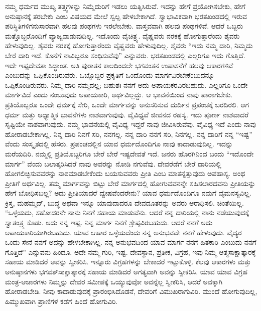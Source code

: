 ನಮ್ಮ ಧರ್ಮದ ಮುಖ್ಯ ತತ್ತ್ವಗಳನ್ನು ನಿಮ್ಮೆದುರಿಗೆ ಇಡಲು ಯತ್ನಿಸಿರುವೆ. ಇದನ್ನು ಹೇಗೆ ಪ್ರಯೋಗಿಸಬೇಕು, ಹೇಗೆ ಅನುಷ್ಠಾನಕ್ಕೆ ತರಬೇಕು ಎಂಬ ವಿಷಯದ ಮೇಲೆ ಸ್ವಲ್ಪ ಹೇಳಬೇಕಾಗಿದೆ. ಸ್ವಾಭಾವಿಕವಾಗಿ ಭರತಖಂಡದಲ್ಲಿ ಇರುವ ಪರಿಸ್ಥಿತಿಗಳಿಗನುಸಾರವಾಗಿ ಹಲವು ಪಂಥಗಳು ಇರಲೇಬೇಕು. ವಾಸ್ತವವಾಗಿ ಹಲವು ಪಂಥಗಳಿವೆ. ಆದರೆ ಒಬ್ಬರು ಮತ್ತೊಬ್ಬರೊಂದಿಗೆ ವ್ಯಾಜ್ಯವಾಡುವುದಿಲ್ಲ. ಇದೊಂದು ವೈಚಿತ್ರ್ಯ. ವೈಷ್ಣವರು ನರಕಕ್ಕೆ ಹೋಗುತ್ತಾರೆಂದು ಶೈವರು ಹೇಳುವುದಿಲ್ಲ. ಶೈವರು ನರಕಕ್ಕೆ ಹೋಗುತ್ತಾರೆಂದು ವೈಷ್ಣವರು ಹೇಳುವುದಿಲ್ಲ. ಶೈವರು “ಇದು ನಮ್ಮ ದಾರಿ, ನಿಮ್ಮದು ಬೇರೆ ದಾರಿ ಇದೆ. ಕೊನೆಗೆ ನಾವಿಬ್ಬರೂ ಸಂಧಿಸುವೆವು” ಎನ್ನುವರು. ಭರತಖಂಡದಲ್ಲಿ ಎಲ್ಲರಿಗೂ ಇದು ಗೊತ್ತಿದೆ. ಇದೇ ಇಷ್ಟದೇವತಾ ಸಿದ್ಧಾಂತ. ಅತಿ ಪುರಾತನ ಕಾಲದಿಂದಲೇ ಭಗವಂತನ ಉಪಾಸನೆಗೆ ಹಲವು ಆಕಾರಗಳಿವೆ ಎಂಬುದನ್ನು ಒಪ್ಪಿಕೊಂಡಿರುವರು. ಒಬ್ಬೊಬ್ಬರ ಪ್ರಕೃತಿಗೆ ಒಂದೊಂದು ಮಾರ್ಗವಿರಬೇಕೆಂಬುದನ್ನೂ ಒಪ್ಪಿಕೊಂಡಿರುವರು. ನಿಮ್ಮ ದಾರಿ ನಮ್ಮದಲ್ಲ; ಬಹುಶಃ ನನಗೆ ಅದು ಅಪಾಯಕರವಿರಬಹುದು. ಎಲ್ಲರಿಗೂ ಒಂದೇ ಮಾರ್ಗವಿದೆ ಎಂದು ನಂಬುವುದು ಅಪಾಯಕಾರಿ, ಅರ್ಥವಿಲ್ಲದ್ದು. ಆ ಭಾವನೆಯಿಂದ ನಾವು ಪಾರಾಗಬೇಕು. ಪ್ರತಿಯೊಬ್ಬರೂ ಒಂದೇ ಧರ್ಮಕ್ಕೆ ಸೇರಿ, ಒಂದೇ ಮಾರ್ಗವನ್ನು ಅನುಸರಿಸುವ ದುರ್ದಿನ ಪ್ರಪಂಚಕ್ಕೆ ಬರದಿರಲಿ. ಆಗ ಧರ್ಮ ಮತ್ತು ಆಧ್ಯಾತ್ಮಿಕ ಭಾವನೆಗಳು ನಾಶವಾಗುವುವು. ವೈವಿಧ್ಯವೆ ಜೀವನದ ರಹಸ್ಯ. ಇದು ಪೂರ್ಣ ನಾಶವಾದರೆ ಸೃಷ್ಟಿಯೇ ನಾಶವಾಗುವುದು. ನಮ್ಮ ಭಾವನೆಯಲ್ಲಿ ವೈವಿಧ್ಯ ಇದ್ದರೆ ನಾವು ಜೀವಿಸಿರುವೆವು. ವೈವಿಧ್ಯ ಇದೆ ಎಂದು ನಾವು ಹೋರಾಡಬೇಕಾಗಿಲ್ಲ. ನಿನ್ನ ದಾರಿ ನಿನಗೆ ಸರಿ, ನನಗಲ್ಲ. ನನ್ನ ದಾರಿ ನನಗೆ ಸರಿ, ನಿನಗಲ್ಲ. ನನ್ನ ದಾರಿಗೆ ನನ್ನ “ಇಷ್ಟ” ವೆಂದು ಸಂಸ್ಕೃತದಲ್ಲಿ ಹೆಸರು. ಪ್ರಪಂಚದಲ್ಲಿನ ಯಾವ ಧರ್ಮದೊಂದಿಗೂ ನಾವು ಕಾದಾಡುವುದಿಲ್ಲ. ಇದನ್ನು ಮರೆಯದಿರಿ. ನಮ್ಮಲ್ಲಿ ಪ್ರತಿಯೊಬ್ಬರಿಗೂ ಬೇರೆ ಬೇರೆ ಇಷ್ಟದೇವತೆ ಇದೆ. ಜನರು ಹೊರಗಿನಿಂದ ಬಂದು “ಇದೊಂದೇ ಮಾರ್ಗ” ವೆಂದು ಬಲಾತ್ಕರಿಸಿದರೆ ನಾವು ಅವರನ್ನು ನೋಡಿ ನಗುವೆವು. ದೇವರೆಡೆಗೆ ಬೇರೆ ದಾರಿಯಲ್ಲಿ ಹೋಗಲಿಚ್ಛಿಸುವವರನ್ನು ನಾಶಮಾಡಬೇಕೆಂದು ಬಯಸುವವರು ಪ್ರೀತಿ ಎಂಬ ಮಾತನ್ನೆತ್ತುವುದು ಅಪಹಾಸ್ಯ. ಅಂಥ ಪ್ರೀತಿಗೆ ಅರ್ಥವಿಲ್ಲ. ತಮ್ಮ ಮಾರ್ಗವನ್ನು ಬಿಟ್ಟು ಬೇರೆ ಮಾರ್ಗದಲ್ಲಿ ಹೋಗುವವನನ್ನೇ ಸಹಿಸಲಾರದವನು ಪ್ರೀತಿಯನ್ನು ಹೇಗೆ ಬೋಧಿಸಬಲ್ಲ? ಅದು ಪ್ರೀತಿಯಾದರೆ ದ್ವೇಷವೆಂದರೇನು? ಯಾವ ಧರ್ಮದೊಂದಿಗೂ ನಮಗೆ ವೈಮನಸ್ಯವಿಲ್ಲ. ಕ್ರಿಸ್ತ, ಮಹಮ್ಮದ್​, ಬುದ್ಧ ಅಥವಾ ಇನ್ನೂ ಯಾವುದಾದರೂ ದೇವದೂತರನ್ನು ಅವರು ಆರಾಧಿಸಲಿ. ಚಿಂತೆಯಿಲ್ಲ. “ಒಳ್ಳೆಯದು, ಸಹೋದರನೇ ನಾನು ನಿನಗೆ ಸಹಾಯ ಮಾಡುವೆನು. ಆದರೆ ನನ್ನ ದಾರಿಯಲ್ಲಿ ನಾನು ನಡೆಯುವುದಕ್ಕೆ ಸ್ವಾತಂತ್ರ್ಯ ಕೊಡು. ಅದು ನನ್ನ ಇಷ್ಟ. ನಿನ್ನ ಮಾರ್ಗ ನಿನಗೆ ಶ್ರೇಷ್ಠವಿರಬಹುದು. ಆದರೆ ನನಗೆ ಅದು ಅಪಾಯಕಾರಿಯಾಗಿರಬಹುದು. ಯಾವ ಆಹಾರ ಒಳ್ಳೆಯದೆಂದು ನನ್ನ ಅನುಭವವೇ ನನಗೆ ಹೇಳುವುದು. ವೈದ್ಯರ ಒಂದು ಸೇನೆ ನನಗೆ ಅದನ್ನು ಹೇಳಬೇಕಾಗಿಲ್ಲ. ನನ್ನ ಅನುಭವದಿಂದ ಯಾವ ಮಾರ್ಗ ನನಗೆ ಹಿತಕಾರಿ ಎಂಬುದು ನನಗೆ ಗೊತ್ತಿದೆ” ಎನ್ನುವನು ಹಿಂದೂ. ಅದೇ ನಮ್ಮ ಗುರಿ, ಇಷ್ಟ. ದೇವಸ್ಥಾನ, ಪ್ರತೀಕ, ವಿಗ್ರಹ, ಇವು ನಿಮ್ಮ ಆತ್ಮಸಾಕ್ಷಾತ್ಕಾರಕ್ಕೆ ಸಹಾಯ ಮಾಡಿದರೆ ಅವನ್ನು ಸ್ವೀಕರಿಸಿ. ಇನ್ನೂರು ವಿಗ್ರಹಗಳನ್ನು ಬೇಕಾದರೆ ಇಟ್ಟುಕೊಳ್ಳಿ. ಕೆಲವು ಆಕಾರಗಳು ಮತ್ತು ಅನುಷ್ಠಾನಗಳು ಭಗವತ್​ ಸಾಕ್ಷಾತ್ಕಾರಕ್ಕೆ ಸಹಾಯ ಮಾಡಿದರೆ ಅಗತ್ಯವಾಗಿ ಅವನ್ನು ಸ್ವೀಕರಿಸಿ. ಯಾವ ಯಾವ ವಿಗ್ರಹ ಮಂತ್ರ-ಆಚಾರಗಳು ನಿಮ್ಮನ್ನು ದೇವರ ಸಮೀಪಕ್ಕೆ ಒಯ್ಯುವುವೋ ಅವನ್ನೆಲ್ಲ ಸ್ವೀಕರಿಸಿ, ಆದರೆ ಅವಕ್ಕಾಗಿ ಹೋರಾಡಬೇಡಿ. ನೀವು ಕಾದಾಡುವುದಕ್ಕೆ ಪ್ರಾರಂಭಿಸಿದೊಡನೆ, ದೇವರಿಗೆ ವಿಮುಖರಾಗುವಿರಿ. ಮುಂದೆ ಹೋಗುವುದಿಲ್ಲ, ಹಿಮ್ಮುಖವಾಗಿ ಪ್ರಾಣಿಗಳ ಕಡೆಗೆ ಹಿಂದೆ ಹೋಗುವಿರಿ.

